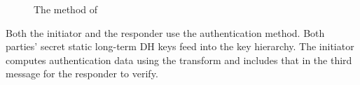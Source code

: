 \begin{figure}[h]
{}
\caption{The \mStatSig{} method of \mEdhoc}
\label{fig:edhocstatsig}
\end{figure}

 
\runhead{\mStatStat}
Both the initiator and the responder use the \mStat{}
authentication method.
%
Both parties' secret static long-term DH keys feed into the key hierarchy.
%
The initiator computes authentication data using the \mAead{} transform
and includes that in the third message for the responder to verify.
%
%

